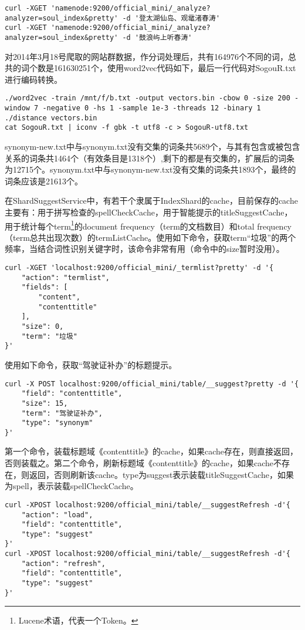 \begin{verbatim}
curl -XGET 'namenode:9200/official_mini/_analyze?analyzer=soul_index&pretty' -d '登太湖仙岛、观鼋渚春涛'
curl -XGET 'namenode:9200/official_mini/_analyze?analyzer=soul_index&pretty' -d '鼓浪屿上听春涛'
\end{verbatim}
\par 对2014年3月18号爬取的网站群数据，作分词处理后，共有164976个不同的词，总共的词个数是161630251个，使用word2vec代码如下，最后一行代码对SogouR.txt进行编码转换。
\begin{verbatim}
./word2vec -train /mnt/f/b.txt -output vectors.bin -cbow 0 -size 200 -window 7 -negative 0 -hs 1 -sample 1e-3 -threads 12 -binary 1
./distance vectors.bin
cat SogouR.txt | iconv -f gbk -t utf8 -c > SogouR-utf8.txt
\end{verbatim}
\par synonym-new.txt中与synonym.txt没有交集的词条共5689个，与其有包含或被包含关系的词条共1464个（有效条目是1318个）,剩下的都是有交集的，扩展后的词条为12715个。synonym.txt中与synonym-new.txt没有交集的词条共1893个，最终的词条应该是21613个。
\par 在ShardSuggestService中，有若干个隶属于IndexShard的cache，目前保存的cache主要有：用于拼写检查的spellCheckCache，用于智能提示的titleSuggestCache，用于统计每个term\footnote{Lucene术语，代表一个Token。}的document frequency（term的文档数目）和total frequency（term总共出现次数）的termListCache。使用如下命令，获取term“垃圾”的两个频率，当结合词性识别关键字时，该命令非常有用（命令中的size暂时没用）。
\begin{verbatim}
curl -XGET 'localhost:9200/official_mini/_termlist?pretty' -d '{
    "action": "termlist", 
    "fields": [
        "content", 
        "contenttitle"
    ], 
    "size": 0, 
    "term": "垃圾"
}'
\end{verbatim}
\par 使用如下命令，获取“驾驶证补办”的标题提示。
\begin{verbatim}
curl -X POST localhost:9200/official_mini/table/__suggest?pretty -d '{
    "field": "contenttitle", 
    "size": 15, 
    "term": "驾驶证补办", 
    "type": "synonym"
}'
\end{verbatim}
\par 第一个命令，装载标题域《contenttitle》的cache，如果cache存在，则直接返回，否则装载之。第二个命令，刷新标题域《contenttitle》的cache，如果cache不存在，则返回，否则刷新该cache。type为suggest表示装载titleSuggestCache，如果为spell，表示装载spellCheckCache。
\begin{verbatim}
curl -XPOST localhost:9200/official_mini/table/__suggestRefresh -d'{
    "action": "load", 
    "field": "contenttitle", 
    "type": "suggest"
}'
curl -XPOST localhost:9200/official_mini/table/__suggestRefresh -d'{   
    "action": "refresh", 
    "field": "contenttitle", 
    "type": "suggest"
}'
\end{verbatim}
